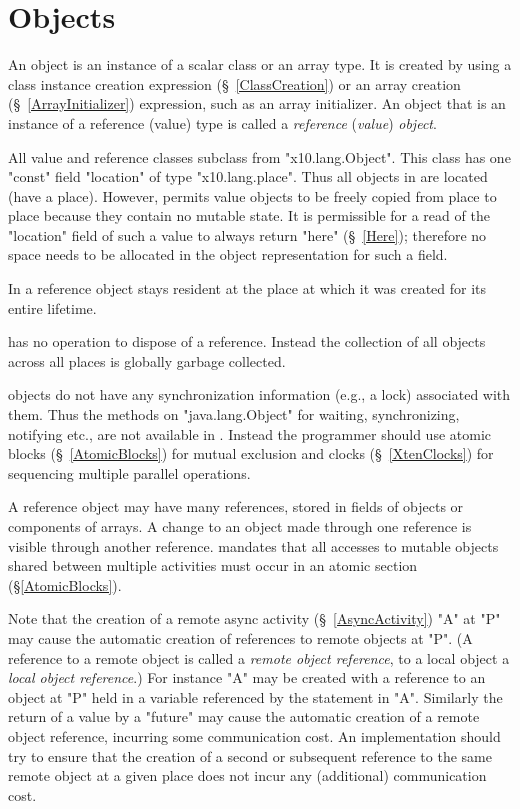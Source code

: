 \chapter{Objects}\label{XtenObjects}

An object is an instance of a scalar class or an array type.  It is
created by using a class instance creation expression
(\S~\ref{ClassCreation}) or an array creation
(\S~\ref{ArrayInitializer}) expression, such as an array
initializer. An object that is an instance of a reference (value) type
is called a {\em reference} ({\em value}) {\em object}.

All value and reference classes subclass from \xcd"x10.lang.Object".
This class has one \xcd"const" field \xcd"location" of type
\xcd"x10.lang.place".  Thus all objects in \Xten{}
are located (have a place). However, \Xten{} permits value objects to
be freely copied from place to place because they contain no mutable
state.  It is permissible for a read of the \xcd"location" field of
such a value to always return \xcd"here" (\S~\ref{Here});
therefore no space needs to be allocated in the object representation
for such a field.

In \XtenCurrVer{} a reference object stays resident at the place at
which it was created for its entire lifetime.

{}\Xten{} has no operation to dispose of a reference.  Instead the
collection of all objects across all places is globally garbage
collected.

{}\Xten{} objects do not have any synchronization information (e.g.,
a lock) associated with them. Thus the methods on \xcd"java.lang.Object"
for waiting, synchronizing, notifying etc., are not
available in \Xten. Instead the programmer should use atomic blocks
(\S~\ref{AtomicBlocks}) for mutual exclusion and clocks
(\S~\ref{XtenClocks}) for sequencing multiple parallel operations.

A reference object may have many references, stored in fields of
objects or components of arrays. A change to an object made through
one reference is visible through another reference. \Xten{} mandates
that all accesses to mutable objects shared between multiple
activities must occur in an atomic section (\S\ref{AtomicBlocks}).

Note that the creation of a remote async activity
(\S~\ref{AsyncActivity}) \xcd"A" at \xcd"P" may cause the automatic creation of
references to remote objects at \xcd"P". (A reference to a remote
object is called a {\em remote object reference}, to a local object a
{\em local object reference}.)  For instance \xcd"A" may be created
with a reference to an object at \xcd"P" held in a variable referenced
by the statement in \xcd"A".  Similarly the return of a value by a
\xcd"future" may cause the automatic creation of a remote object
reference, incurring some communication cost.  An {}\Xten{}
implementation should try to ensure that the creation of a second or
subsequent reference to the same remote object at a given place does
not incur any (additional) communication cost.

